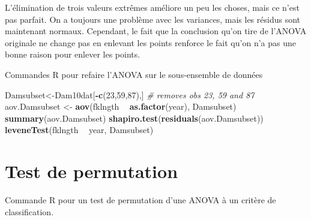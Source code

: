 \documentclass[12pt,]{book}
\newenvironment{Shaded}{\begin{snugshade}}{\end{snugshade}}
\newcommand{\CommentTok}[1]{\textcolor[rgb]{0.37,0.37,0.37}{\textit{#1}}}
\newcommand{\DecValTok}[1]{\textcolor[rgb]{0.06,0.06,0.06}{#1}}
\newcommand{\KeywordTok}[1]{\textcolor[rgb]{0.27,0.27,0.27}{\textbf{#1}}}
\newcommand{\NormalTok}[1]{#1}
\newcommand{\OperatorTok}[1]{\textcolor[rgb]{0.43,0.43,0.43}{\textbf{#1}}}
\newcommand{\StringTok}[1]{\textcolor[rgb]{0.5,0.5,0.5}{#1}}
\begin{document}
L'élimination de trois valeurs extrêmes améliore un peu les choses, mais ce n'est pas parfait. On a toujours une problème avec les variances, mais les résidus sont maintenant normaux. Cependant, le fait que la conclusion qu'on tire de l'ANOVA originale ne change pas en enlevant les points renforce le fait qu'on n'a pas une bonne raison pour enlever les points.

Commandes R pour refaire l'ANOVA sur le sous-ensemble de données

\begin{Shaded}
\begin{Highlighting}[]
\NormalTok{Damsubset<-Dam10dat[}\OperatorTok{-}\KeywordTok{c}\NormalTok{(}\DecValTok{23}\NormalTok{,}\DecValTok{59}\NormalTok{,}\DecValTok{87}\NormalTok{),]}
\CommentTok{# removes obs 23, 59 and 87}
\NormalTok{aov.Damsubset <-}\StringTok{ }\KeywordTok{aov}\NormalTok{(fklngth }\OperatorTok{~}\StringTok{ }\KeywordTok{as.factor}\NormalTok{(year), Damsubset)}
\KeywordTok{summary}\NormalTok{(aov.Damsubset)}
\KeywordTok{shapiro.test}\NormalTok{(}\KeywordTok{residuals}\NormalTok{(aov.Damsubset))}
\KeywordTok{leveneTest}\NormalTok{(fklngth }\OperatorTok{~}\StringTok{ }\NormalTok{year, Damsubset)}
\end{Highlighting}
\end{Shaded}

\hypertarget{test-de-permutation}{%
\section{Test de permutation}\label{test-de-permutation}}

Commande R pour un test de permutation d'une ANOVA à un critère de classification.
\end{document}
